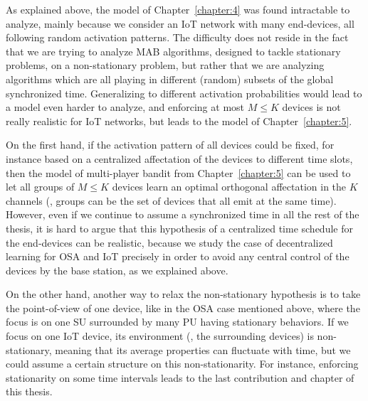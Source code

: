 As explained above, the model of Chapter~\ref{chapter:4} was found intractable to analyze, mainly because we consider an IoT network with many end-devices, all following random activation patterns.
The difficulty does not reside in the fact that we are trying to analyze MAB algorithms, designed to tackle stationary problems, on a non-stationary problem,
but rather that we are analyzing algorithms which are all playing in different (random) subsets of the global synchronized time.
Generalizing to different activation probabilities would lead to a model even harder to analyze, and enforcing at most $M \leq K$ devices is not really realistic for IoT networks, but leads to the model of Chapter~\ref{chapter:5}.

On the first hand, if the activation pattern of all devices could be fixed, for instance based on a centralized affectation of the devices to different time slots, then the model of multi-player bandit from Chapter~\ref{chapter:5} can be used to let all groups of $M \leq K$ devices learn an optimal orthogonal affectation in the $K$ channels (\eg, groups can be the set of devices that all emit at the same time).
%
However, even if we continue to assume a synchronized time in all the rest of the thesis,
it is hard to argue that this hypothesis of a centralized time schedule for the end-devices can be realistic, because we study the case of decentralized learning for OSA and IoT precisely in order to avoid any central control of the devices by the base station, as we explained above.

On the other hand, another way to relax the non-stationary hypothesis is to take the point-of-view of one device, like in the OSA case mentioned above, where the focus is on one SU surrounded by many PU having stationary behaviors.
If we focus on one IoT device, its environment (\ie, the surrounding devices) is non-stationary, meaning that its average properties can fluctuate with time, but we could assume a certain structure on this non-stationarity.
For instance, enforcing stationarity on some time intervals leads to the last contribution and chapter of this thesis.


